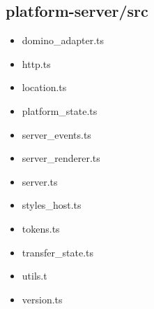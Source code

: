 \subsection{platform-server/src}


\begin{itemize}
  \item domino\_adapter.ts
  \item http.ts
  \item location.ts
  \item platform\_state.ts
  \item server\_events.ts
  \item server\_renderer.ts
  \item server.ts
  \item styles\_host.ts
  \item tokens.ts
  \item transfer\_state.ts
  \item utils.t
  \item version.ts
\end{itemize}












